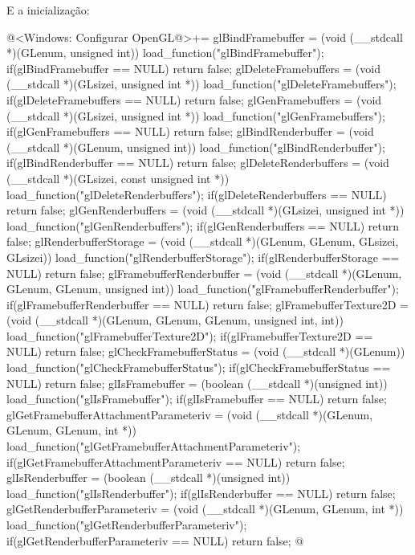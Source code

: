 E a inicialização:

\iniciocodigo
@<Windows: Configurar OpenGL@>+=
glBindFramebuffer = (void (__stdcall *)(GLenum, unsigned int))
                       load_function("glBindFramebuffer");
if(glBindFramebuffer == NULL) return false;
glDeleteFramebuffers = (void (__stdcall *)(GLsizei, unsigned int *))
                           load_function("glDeleteFramebuffers");
if(glDeleteFramebuffers == NULL) return false;
glGenFramebuffers = (void (__stdcall *)(GLsizei, unsigned int *))
                       load_function("glGenFramebuffers");
if(glGenFramebuffers == NULL) return false;
glBindRenderbuffer = (void (__stdcall *)(GLenum, unsigned int))
                         load_function("glBindRenderbuffer");
if(glBindRenderbuffer == NULL) return false;
glDeleteRenderbuffers = (void (__stdcall *)(GLsizei, const unsigned int *))
                           load_function("glDeleteRenderbuffers");
if(glDeleteRenderbuffers == NULL) return false;
glGenRenderbuffers = (void (__stdcall *)(GLsizei, unsigned int *))
                         load_function("glGenRenderbuffers");
if(glGenRenderbuffers == NULL) return false;
glRenderbufferStorage = (void (__stdcall *)(GLenum, GLenum, GLsizei, GLsizei))
                           load_function("glRenderbufferStorage");
if(glRenderbufferStorage == NULL) return false;
glFramebufferRenderbuffer = (void (__stdcall *)(GLenum, GLenum, GLenum,
                                                unsigned int))
                              load_function("glFramebufferRenderbuffer");
if(glFramebufferRenderbuffer == NULL) return false;
glFramebufferTexture2D = (void (__stdcall *)(GLenum, GLenum, GLenum,
                                             unsigned int, int))
                            load_function("glFramebufferTexture2D");
if(glFramebufferTexture2D == NULL) return false;
glCheckFramebufferStatus = (void (__stdcall *)(GLenum))
                               load_function("glCheckFramebufferStatus");
if(glCheckFramebufferStatus == NULL) return false;
glIsFramebuffer = (boolean (__stdcall *)(unsigned int))
                   load_function("glIsFramebuffer");
if(glIsFramebuffer == NULL) return false;
glGetFramebufferAttachmentParameteriv = (void (__stdcall *)(GLenum, GLenum,
                                                            GLenum, int *))
                        load_function("glGetFramebufferAttachmentParameteriv");
if(glGetFramebufferAttachmentParameteriv == NULL) return false;
glIsRenderbuffer = (boolean (__stdcall *)(unsigned int))
                       load_function("glIsRenderbuffer");
if(glIsRenderbuffer == NULL) return false;
glGetRenderbufferParameteriv = (void (__stdcall *)(GLenum, GLenum, int *))
                                  load_function("glGetRenderbufferParameteriv");
if(glGetRenderbufferParameteriv == NULL) return false;
@
\fimcodigo

